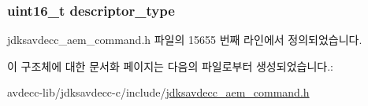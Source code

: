 \subsubsection[{\texorpdfstring{descriptor\+\_\+type}{descriptor_type}}]{\setlength{\rightskip}{0pt plus 5cm}uint16\+\_\+t descriptor\+\_\+type}\hypertarget{structjdksavdecc__aem__command__set__clock__source_ab7c32b6c7131c13d4ea3b7ee2f09b78d}{}\label{structjdksavdecc__aem__command__set__clock__source_ab7c32b6c7131c13d4ea3b7ee2f09b78d}


jdksavdecc\+\_\+aem\+\_\+command.\+h 파일의 15655 번째 라인에서 정의되었습니다.



이 구조체에 대한 문서화 페이지는 다음의 파일로부터 생성되었습니다.\+:\begin{DoxyCompactItemize}
\item 
avdecc-\/lib/jdksavdecc-\/c/include/\hyperlink{jdksavdecc__aem__command_8h}{jdksavdecc\+\_\+aem\+\_\+command.\+h}\end{DoxyCompactItemize}
